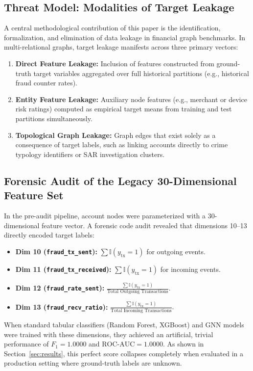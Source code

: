 \documentclass[conference]{IEEEtran}
\begin{document}
\subsection{Threat Model: Modalities of Target Leakage}
A central methodological contribution of this paper is the identification, formalization, and elimination of data leakage in financial graph benchmarks. In multi-relational graphs, target leakage manifests across three primary vectors:
\begin{enumerate}
    \item \textbf{Direct Feature Leakage:} Inclusion of features constructed from ground-truth target variables aggregated over full historical partitions (e.g., historical fraud counter rates).
    \item \textbf{Entity Feature Leakage:} Auxiliary node features (e.g., merchant or device risk ratings) computed as empirical target means from training and test partitions simultaneously.
    \item \textbf{Topological Graph Leakage:} Graph edges that exist solely as a consequence of target labels, such as linking accounts directly to crime typology identifiers or SAR investigation clusters.
\end{enumerate}

\subsection{Forensic Audit of the Legacy 30-Dimensional Feature Set}
In the pre-audit pipeline, account nodes were parameterized with a 30-dimensional feature vector. A forensic code audit revealed that dimensions 10--13 directly encoded target labels:
\begin{itemize}
    \item \textbf{Dim 10 (\texttt{fraud\_tx\_sent}):} $\sum \mathbb{I}(y_{\text{tx}} = 1)$ for outgoing events.
    \item \textbf{Dim 11 (\texttt{fraud\_tx\_received}):} $\sum \mathbb{I}(y_{\text{tx}} = 1)$ for incoming events.
    \item \textbf{Dim 12 (\texttt{fraud\_rate\_sent}):} $\frac{\sum \mathbb{I}(y_{\text{tx}} = 1)}{\text{Total Outgoing Transactions}}$.
    \item \textbf{Dim 13 (\texttt{fraud\_recv\_ratio}):} $\frac{\sum \mathbb{I}(y_{\text{tx}} = 1)}{\text{Total Incoming Transactions}}$.
\end{itemize}

When standard tabular classifiers (Random Forest, XGBoost) and GNN models were trained with these dimensions, they achieved an artificial, trivial performance of $F_1 = 1.0000$ and $\text{ROC-AUC} = 1.0000$. As shown in Section~\ref{sec:results}, this perfect score collapses completely when evaluated in a production setting where ground-truth labels are unknown.
\end{document}

